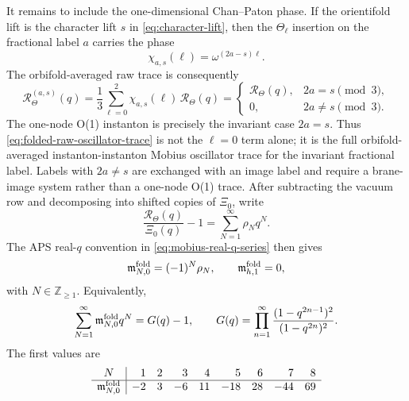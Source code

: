 \documentclass[11pt]{article}
\newcommand{\Z}{\mathbb{Z}}
\begin{document}
It remains to include the one-dimensional Chan--Paton phase. If the orientifold lift is the
character lift \(s\) in \eqref{eq:character-lift}, then the \(\Theta_\ell\) insertion on the
fractional label \(a\) carries the phase
\begin{equation}
  \chi_{a,s}(\ell)=\omega^{(2a-s)\ell}.
  \label{eq:one-node-mobius-cp-phase}
\end{equation}
The orbifold-averaged raw trace is consequently
\begin{equation}
  \mathcal R_{\Theta}^{(a,s)}(q)
  =
  \frac13\sum_{\ell=0}^{2}\chi_{a,s}(\ell)\,\mathcal R_\Theta(q)
  =
  \begin{cases}
    \mathcal R_\Theta(q), & 2a=s\pmod 3,\\[2pt]
    0, & 2a\ne s\pmod 3.
  \end{cases}
  \label{eq:orbifold-averaged-folded-trace}
\end{equation}
The one-node O(1) instanton is precisely the invariant case \(2a=s\). Thus
\eqref{eq:folded-raw-oscillator-trace} is not the \(\ell=0\) term alone; it is the full
orbifold-averaged instanton-instanton Mobius oscillator trace for the invariant fractional
label. Labels with \(2a\ne s\) are exchanged with an image label and require a brane-image
system rather than a one-node O(1) trace.
After subtracting the vacuum row and decomposing into shifted copies of \(\Xi_0\), write
\begin{equation}
  \frac{\mathcal R_\Theta(q)}{\Xi_0(q)}-1
  =
  \sum_{N=1}^{\infty}\rho_N q^N .
  \label{eq:folded-rho-definition}
\end{equation}
The APS real-\(q\) convention in \eqref{eq:mobius-real-q-series} then gives
\begin{equation}
  \mathfrak m_{N,0}^{\rm fold}=(-1)^N\rho_N,
  \qquad
  \mathfrak m_{h,1}^{\rm fold}=0,
  \label{eq:folded-signed-traces}
\end{equation}
with \(N\in\Z_{\ge1}\).  Equivalently,
\begin{equation}
  \sum_{N=1}^{\infty}\mathfrak m_{N,0}^{\rm fold}q^N
  =
  G(q)-1,
  \qquad
  G(q)=
  \prod_{n=1}^{\infty}
  \frac{(1-q^{2n-1})^2}{(1-q^{2n})^2}.
  \label{eq:folded-signed-trace-product}
\end{equation}
The first values are
\begin{equation}
  \begin{array}{c|rrrrrrrr}
  N & 1&2&3&4&5&6&7&8\\
  \hline
  \mathfrak m_{N,0}^{\rm fold}
    & -2&3&-6&11&-18&28&-44&69
  \end{array}
  \label{eq:folded-first-signed-traces}
\end{equation}
\end{document}
